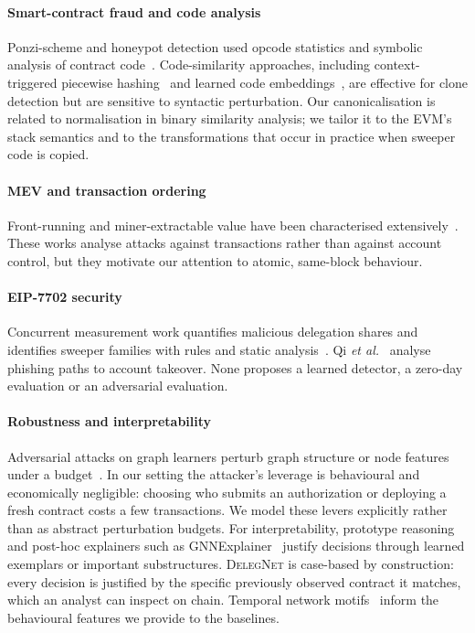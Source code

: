\documentclass[journal]{IEEEtran}
\newcommand{\dn}{\textsc{DelegNet}}
\begin{document}
\paragraph{Smart-contract fraud and code analysis} Ponzi-scheme and honeypot detection used opcode statistics and symbolic analysis of contract code~\cite{chen2018ponzi,torres2019honeybadger}. Code-similarity approaches, including context-triggered piecewise hashing~\cite{kornblum2006ssdeep} and learned code embeddings~\cite{gao2019smartembed}, are effective for clone detection but are sensitive to syntactic perturbation. Our canonicalisation is related to normalisation in binary similarity analysis; we tailor it to the EVM's stack semantics and to the transformations that occur in practice when sweeper code is copied.

\paragraph{MEV and transaction ordering} Front-running and miner-extractable value have been characterised extensively~\cite{daian2020flashboys,torres2021frontrunner}. These works analyse attacks against transactions rather than against account control, but they motivate our attention to atomic, same-block behaviour.

\paragraph{EIP-7702 security} Concurrent measurement work quantifies malicious delegation shares and identifies sweeper families with rules and static analysis~\cite{wintermute2025,huang2026eip7702}. Qi \emph{et al.}~\cite{qi2025eip7702phishing} analyse phishing paths to account takeover. None proposes a learned detector, a zero-day evaluation or an adversarial evaluation.

\paragraph{Robustness and interpretability} Adversarial attacks on graph learners perturb graph structure or node features under a budget~\cite{zugner2018nettack}. In our setting the attacker's leverage is behavioural and economically negligible: choosing who submits an authorization or deploying a fresh contract costs a few transactions. We model these levers explicitly rather than as abstract perturbation budgets. For interpretability, prototype reasoning~\cite{chen2019thislooks} and post-hoc explainers such as GNNExplainer~\cite{ying2019gnnexplainer} justify decisions through learned exemplars or important substructures. \dn{} is case-based by construction: every decision is justified by the specific previously observed contract it matches, which an analyst can inspect on chain. Temporal network motifs~\cite{paranjape2017motifs} inform the behavioural features we provide to the baselines.
\end{document}

